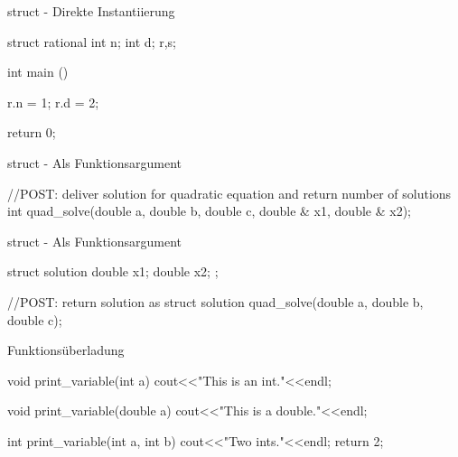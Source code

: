 \ifnum\conditionmacro=1 \documentclass[handout,usenames,dvipsnames]{beamer}\fi
\begin{document}
\begin{frame}[fragile]{struct - Direkte Instantiierung}
\begin{TFCpp}
struct rational{
	int n;
	int d;
}r,s;

int main (){
	r.n = 1;
	r.d = 2;
	
	return 0;
}
\end{TFCpp}
\end{frame}

\begin{frame}[fragile]{struct - Als Funktionsargument}
\begin{TFCpp}
//POST: deliver solution for quadratic equation and return number of solutions
int quad_solve(double a, double b, double c, double & x1, double & x2);

\end{TFCpp}
\end{frame}

\begin{frame}[fragile]{struct - Als Funktionsargument}
\begin{TFCpp}
struct solution{
	double x1;
	double x2;
};

//POST: return solution as struct
solution quad_solve(double a, double b, double c);

\end{TFCpp}
\end{frame}

\begin{frame}[fragile]{Funktionsüberladung}
\begin{TFCpp}
void print_variable(int a){
	cout<<"This is an int."<<endl;
}

void print_variable(double a){
	cout<<"This is a double."<<endl;
}

int print_variable(int a, int b){
	cout<<"Two ints."<<endl;
	return 2;
}
\end{TFCpp}

\end{frame}

\end{document}

